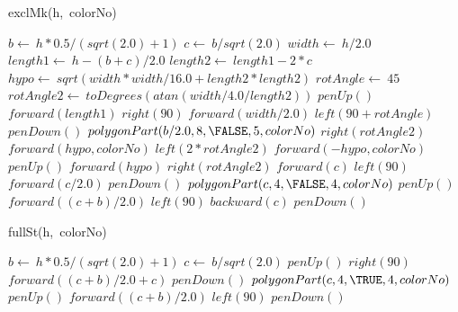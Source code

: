 \documentclass[a4paper,10pt]{article}
\begin{document}
\begin{algorithm}
\caption{exclMk(h,\ colorNo)}
\begin{algorithmic}[5]

\STATE {}
\STATE {}
  \STATE \(b\gets\ h*0.5/(sqrt(2.0)+1)\)
  \STATE \(c\gets\ b/sqrt(2.0)\)
  \STATE \(width\gets\ h/2.0\)
  \STATE \(length1\gets\ h-(b+c)/2.0\)
  \STATE \(length2\gets\ length1-2*c\)
  \STATE \(hypo\gets\ sqrt(width*width/16.0+length2*length2)\)
  \STATE \(rotAngle\gets\ 45\)
  \STATE \(rotAngle2\gets\ toDegrees(atan(width/4.0/length2))\)
  \STATE \(penUp()\)
  \STATE \(forward(length1)\)
  \STATE \(right(90)\)
  \STATE \(forward(width/2.0)\)
  \STATE \(left(90+rotAngle)\)
  \STATE \(penDown()\)
  \STATE {}
  \STATE {}
  \STATE \(polygonPart(b/2.0,8,\FALSE,5,colorNo)\)
  \STATE \(right(rotAngle2)\)
  \STATE \(forward(hypo,colorNo)\)
  \STATE \(left(2*rotAngle2)\)
  \STATE \(forward(-hypo,colorNo)\)
  \STATE \(penUp()\)
  \STATE \(forward(hypo)\)
  \STATE \(right(rotAngle2)\)
  \STATE \(forward(c)\)
  \STATE \(left(90)\)
  \STATE \(forward(c/2.0)\)
  \STATE \(penDown()\)
  \STATE {}
  \STATE {}
  \STATE \(polygonPart(c,4,\FALSE,4,colorNo)\)
  \STATE \(penUp()\)
  \STATE \(forward((c+b)/2.0)\)
  \STATE \(left(90)\)
  \STATE \(backward(c)\)
  \STATE \(penDown()\)

\end{algorithmic}
\end{algorithm}


\begin{algorithm}
\caption{fullSt(h,\ colorNo)}
\begin{algorithmic}[5]

\STATE {}
\STATE {}
  \STATE \(b\gets\ h*0.5/(sqrt(2.0)+1)\)
  \STATE \(c\gets\ b/sqrt(2.0)\)
  \STATE \(penUp()\)
  \STATE \(right(90)\)
  \STATE \(forward((c+b)/2.0+c)\)
  \STATE \(penDown()\)
  \STATE {}
  \STATE {}
  \STATE \(polygonPart(c,4,\TRUE,4,colorNo)\)
  \STATE \(penUp()\)
  \STATE \(forward((c+b)/2.0)\)
  \STATE \(left(90)\)
  \STATE \(penDown()\)

\end{algorithmic}
\end{algorithm}
\end{document}
